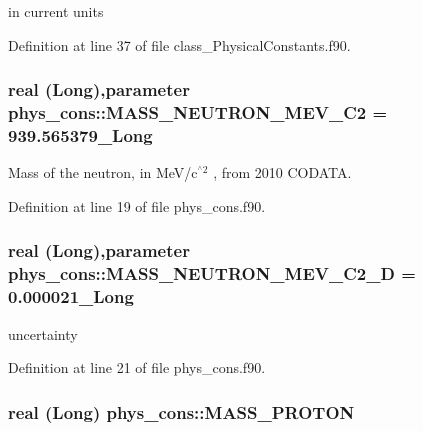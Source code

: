 in current units 



Definition at line 37 of file class\_\-PhysicalConstants.f90.

\hypertarget{namespacephys__cons_a9e80f5448f5f42cf9983890809e55d88}{
\subsubsection[{MASS\_\-NEUTRON\_\-MEV\_\-C2}]{\setlength{\rightskip}{0pt plus 5cm}real (Long),parameter {\bf phys\_\-cons::MASS\_\-NEUTRON\_\-MEV\_\-C2} = 939.565379\_\-Long}}
\label{namespacephys__cons_a9e80f5448f5f42cf9983890809e55d88}


Mass of the neutron, in MeV/c$^{\mbox{$^\wedge$2}}$ , from 2010 CODATA. 



Definition at line 19 of file phys\_\-cons.f90.

\hypertarget{namespacephys__cons_ab5fb46dc243eb307a344a134a593edd0}{
\subsubsection[{MASS\_\-NEUTRON\_\-MEV\_\-C2\_\-D}]{\setlength{\rightskip}{0pt plus 5cm}real (Long),parameter {\bf phys\_\-cons::MASS\_\-NEUTRON\_\-MEV\_\-C2\_\-D} = 0.000021\_\-Long}}
\label{namespacephys__cons_ab5fb46dc243eb307a344a134a593edd0}


uncertainty 



Definition at line 21 of file phys\_\-cons.f90.

\hypertarget{namespacephys__cons_a20e8ed3d7ff389588ce024048c5ccf85}{
\subsubsection[{MASS\_\-PROTON}]{\setlength{\rightskip}{0pt plus 5cm}real (Long) {\bf phys\_\-cons::MASS\_\-PROTON}}}
\label{namespacephys__cons_a20e8ed3d7ff389588ce024048c5ccf85}


